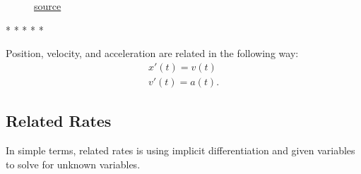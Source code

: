 \documentclass[12pt]{article}
\begin{document}
\begin{figure}[H]
    \begin{center}
        \caption{\href{https://www.khanacademy.org/science/physics/one-dimensional-motion/acceleration-tutorial/a/acceleration-article?modal=1}{source}}
        \label{fig:posveloaccel}
    \end{center}
\end{figure}

\begin{center}
    * * * * *
\end{center}

\noindent Position, velocity, and acceleration are related in the following way:
\begin{gather*}
    x'(t) = v(t) \\
    v'(t) = a(t).
\end{gather*}

\subsection{Related Rates}
In simple terms, related rates is using implicit differentiation and given variables to solve for unknown variables. %
\end{document}
